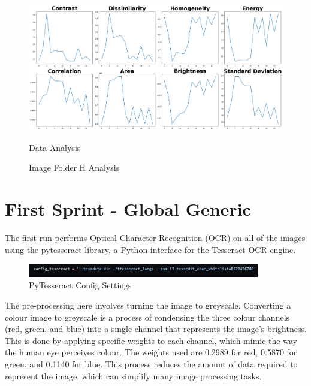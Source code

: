 \begin{figure}[ht]
\begin{minipage}[t]{0.50\textwidth}
        \includegraphics[width=\textwidth]{Figures/EDA_Charts/11/da.png}
        \caption*{Data Analysis}
    \end{minipage}
    \caption{Image Folder H Analysis}
    \label{fig:Image Folder H Analysis}
\end{figure}


\newpage

\section{First Sprint - Global Generic}

The first run performs Optical Character Recognition (OCR) on all of the images using the pytesseract library, a Python interface for the Tesseract OCR engine.

\begin{figure}[ht]
    \centering
    \includegraphics[width=0.9\textwidth]{Figures/firstrun/tesseract_config.jpg}
    \caption[PyTesseract Config Settings]{PyTesseract Config Settings}
    \label{fig:PyTesseract Config Settings}
\end{figure}


The pre-processing here involves turning the image to greyscale. Converting a colour image to greyscale is a process of condensing the three colour channels (red, green, and blue) into a single channel that represents the image's brightness. This is done by applying specific weights to each channel, which mimic the way the human eye perceives colour. The weights used are 0.2989 for red, 0.5870 for green, and 0.1140 for blue. This process reduces the amount of data required to represent the image, which can simplify many image processing tasks. \cite{cadikPerceptualEvaluationColortoGrayscale2008}

